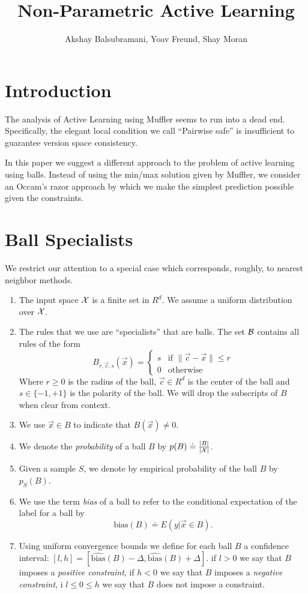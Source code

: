\documentclass{article}
\title{Non-Parametric Active Learning}
\author{Akshay Balsubramani, Yoav Freund, Shay Moran}
\newcommand{\X}{{\cal X}}
\newcommand{\B}{{\cal B}}
\newcommand{\x}{\vec{x}}
\newcommand{\cc}{\vec{c}}
\newcommand{\bias}{\text{bias}}
\newcommand{\ebias}{\widehat{\text{bias}}}
\newcommand{\samp}{S}
\begin{document}
\maketitle
\section{Introduction}

The analysis of Active Learning using Muffler seems to run into a dead
end. Specifically, the elegant local condition we call ``Pairwise
safe'' is insufficient to guarantee version space consistency.

In this paper we suggest a different approach to the problem of active
learning using balls. Instead of using the min/max solution given by
Muffler, we consider an Occam's razor approach by which we make the
simplest prediction possible given the constraints.

\section{Ball Specialists}

We restrict our attention to a special case which corresponds,
roughly, to nearest neighbor methods.
\begin{enumerate}
\item The input space $\X$ is a finite set in $R^d$. We assume a
  uniform distribution over $\X$.
  \item
    The rules that we use are ``specialists'' that are balls. The set
    $\B$ contains all rules of the form
    \[
    B_{r,\cc,s}(\x) =
    \begin{cases}
      s & \text{if } \| \cc- \x \| \leq r \\
    0 & \text{otherwise }
    \end{cases}
    \]
    Where $r \geq 0$ is the radius of the ball, $\cc \in R^d$ is the
    center of the ball and $s \in \{-1,+1\}$ is the polarity of the ball.
    We will drop the subscripts of $B$ when clear from context.
  \item
    We use $\x \in B$ to indicate that $B(\x) \neq 0$.
  \item
    We denote the {\em probability} of a ball $B$ by $p(B) \doteq
    \frac{|B|}{|\X|}$.
  \item Given a sample $\samp$, we denote by empirical probability of the ball $B$ by $p_{\samp}(B)$.
  \item
    We use the term {\em bias} of a ball to refer to the conditional
    expectation of the label for a ball by
    \[
    \bias(B) \doteq E\left( y|\x \in B \right).
    \]
  \item Using uniform convergence bounds we define for each ball $B$
    a confidence interval:
    $[l,h]=[\ebias(B)-\Delta,\ebias(B)+\Delta]$.
    if $l>0$ we say that $B$ imposes a {\em positive constraint}, if
    $h<0$ we say that $B$ imposes a {\em negative constraint}, i
    $l\leq 0 \leq h$ we say that $B$ does not impose a constraint.
\end{enumerate}
\end{document}
